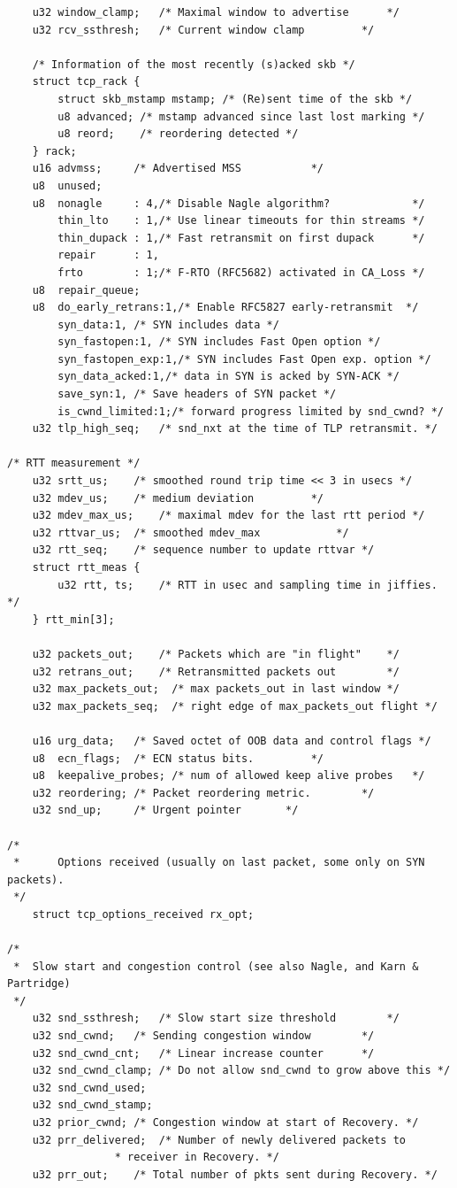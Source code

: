 \documentclass[11pt, a4paper,oneside]{book}
\theoremstyle{ocrenumbox}
\theoremstyle{purplenumbox}
\theoremstyle{blackbox}
\begin{document}
\begin{verbatim}
	u32	window_clamp;	/* Maximal window to advertise		*/
	u32	rcv_ssthresh;	/* Current window clamp			*/

	/* Information of the most recently (s)acked skb */
	struct tcp_rack {
		struct skb_mstamp mstamp; /* (Re)sent time of the skb */
		u8 advanced; /* mstamp advanced since last lost marking */
		u8 reord;    /* reordering detected */
	} rack;
	u16	advmss;		/* Advertised MSS			*/
	u8	unused;
	u8	nonagle     : 4,/* Disable Nagle algorithm?             */
		thin_lto    : 1,/* Use linear timeouts for thin streams */
		thin_dupack : 1,/* Fast retransmit on first dupack      */
		repair      : 1,
		frto        : 1;/* F-RTO (RFC5682) activated in CA_Loss */
	u8	repair_queue;
	u8	do_early_retrans:1,/* Enable RFC5827 early-retransmit  */
		syn_data:1,	/* SYN includes data */
		syn_fastopen:1,	/* SYN includes Fast Open option */
		syn_fastopen_exp:1,/* SYN includes Fast Open exp. option */
		syn_data_acked:1,/* data in SYN is acked by SYN-ACK */
		save_syn:1,	/* Save headers of SYN packet */
		is_cwnd_limited:1;/* forward progress limited by snd_cwnd? */
	u32	tlp_high_seq;	/* snd_nxt at the time of TLP retransmit. */

/* RTT measurement */
	u32	srtt_us;	/* smoothed round trip time << 3 in usecs */
	u32	mdev_us;	/* medium deviation			*/
	u32	mdev_max_us;	/* maximal mdev for the last rtt period	*/
	u32	rttvar_us;	/* smoothed mdev_max			*/
	u32	rtt_seq;	/* sequence number to update rttvar	*/
	struct rtt_meas {
		u32 rtt, ts;	/* RTT in usec and sampling time in jiffies. */
	} rtt_min[3];

	u32	packets_out;	/* Packets which are "in flight"	*/
	u32	retrans_out;	/* Retransmitted packets out		*/
	u32	max_packets_out;  /* max packets_out in last window */
	u32	max_packets_seq;  /* right edge of max_packets_out flight */

	u16	urg_data;	/* Saved octet of OOB data and control flags */
	u8	ecn_flags;	/* ECN status bits.			*/
	u8	keepalive_probes; /* num of allowed keep alive probes	*/
	u32	reordering;	/* Packet reordering metric.		*/
	u32	snd_up;		/* Urgent pointer		*/

/*
 *      Options received (usually on last packet, some only on SYN packets).
 */
	struct tcp_options_received rx_opt;

/*
 *	Slow start and congestion control (see also Nagle, and Karn & Partridge)
 */
 	u32	snd_ssthresh;	/* Slow start size threshold		*/
 	u32	snd_cwnd;	/* Sending congestion window		*/
	u32	snd_cwnd_cnt;	/* Linear increase counter		*/
	u32	snd_cwnd_clamp; /* Do not allow snd_cwnd to grow above this */
	u32	snd_cwnd_used;
	u32	snd_cwnd_stamp;
	u32	prior_cwnd;	/* Congestion window at start of Recovery. */
	u32	prr_delivered;	/* Number of newly delivered packets to
				 * receiver in Recovery. */
	u32	prr_out;	/* Total number of pkts sent during Recovery. */


\end{verbatim}
\end{document}
